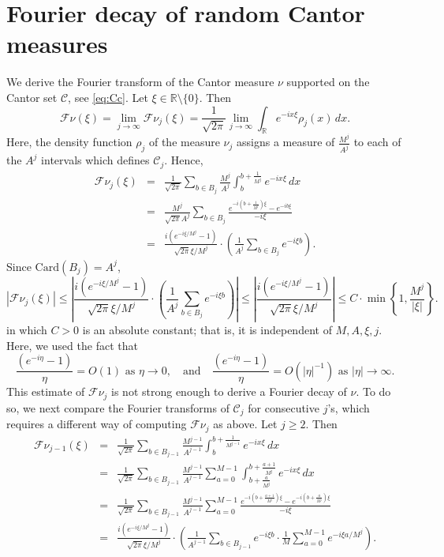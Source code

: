 \documentclass[12pt,reqno]{amsart}
\newcommand\Card{\mathrm{Card}}
\newcommand\Cc{\mathcal{C}}
\newcommand\Fc{\mathcal{F}}
\newcommand\R{\mathbb{R}}
\theoremstyle{plain}
\theoremstyle{remark}
\numberwithin{equation}{section}
\begin{document}
\section{Fourier decay of random Cantor measures}\label{sec:FD}
We derive the Fourier transform of the Cantor measure $\nu$ supported on the Cantor set $\Cc$, see \eqref{eq:Cc}. Let $\xi\in\R\setminus\{0\}$. Then 
$$\Fc\nu(\xi)=\lim_{j\to\infty}\Fc\nu_j(\xi)=\frac{1}{\sqrt{2\pi}}\lim_{j\to\infty}\int_\R e^{-ix\xi}\rho_j(x)\,dx.$$
Here, the density function $\rho_j$ of the measure $\nu_j$ assigns a measure of $\frac{M^j}{A^j}$ to each of the $A^j$ intervals which defines $\Cc_j$. Hence,
\begin{eqnarray*}
\Fc\nu_j(\xi)&=&\frac{1}{\sqrt{2\pi}}\sum_{b\in B_j}\frac{M^j}{A^j}\int_b^{b+\frac{1}{M^j}}e^{-ix\xi}\,dx\\
&=&\frac{M^j}{\sqrt{2\pi}A^j}\sum_{b\in B_j}\frac{e^{-i\left(b+\frac{1}{M^j}\right)\xi}-e^{-ib\xi}}{-i\xi}\\
&=&\frac{i\left(e^{-i\xi/M^j}-1\right)}{\sqrt{2\pi}\xi/M^j}\cdot\left(\frac{1}{A^j}\sum_{b\in B_j}e^{-i\xi b}\right).
\end{eqnarray*}
Since $\Card(B_j)=A^j$,
$$\left|\Fc\nu_j(\xi)\right|\le\left|\frac{i\left(e^{-i\xi/M^j}-1\right)}{\sqrt{2\pi}\xi/M^j}\cdot\left(\frac{1}{A^j}\sum_{b\in B_j}e^{-i\xi b}\right)\right|\le\left|\frac{i\left(e^{-i\xi/M^j}-1\right)}{\sqrt{2\pi}\xi/M^j}\right|\le C\cdot\min\left\{1,\frac{M^j}{|\xi|}\right\}.$$
in which $C>0$ is an absolute constant; that is, it is independent of $M,A,\xi,j$. Here, we used the fact that
$$\frac{\left(e^{-i\eta}-1\right)}{\eta}=O(1)\text{ as }\eta\to0,\quad\text{and}\quad\frac{\left(e^{-i\eta}-1\right)}{\eta}=O\left(|\eta|^{-1}\right)\text{ as }|\eta|\to\infty.$$
This estimate of $\Fc\nu_j$ is not strong enough to derive a Fourier decay of $\nu$. To do so, we next compare the Fourier transforms of $\Cc_j$ for consecutive $j$'s, which requires a different way of computing $\Fc\nu_j$ as above. Let $j\ge2$. Then
\begin{eqnarray*}
\Fc\nu_{j-1}(\xi)&=&\frac{1}{\sqrt{2\pi}}\sum_{b\in B_{j-1}}\frac{M^{j-1}}{A^{j-1}}\int_b^{b+\frac{1}{M^{j-1}}}e^{-ix\xi}\,dx\\
&=&\frac{1}{\sqrt{2\pi}}\sum_{b\in B_{j-1}}\frac{M^{j-1}}{A^{j-1}}\sum_{a=0}^{M-1}\int_{b+\frac{a}{M^j}}^{b+\frac{a+1}{M^j}}e^{-ix\xi}\,dx\\
&=&\frac{1}{\sqrt{2\pi}}\sum_{b\in B_{j-1}}\frac{M^{j-1}}{A^{j-1}}\sum_{a=0}^{M-1}\frac{e^{-i\left(b+\frac{a+1}{M^j}\right)\xi}-e^{-i\left(b+\frac{a}{M^j}\right)\xi}}{-i\xi}\\
&=&\frac{i\left(e^{-i\xi/M^j}-1\right)}{\sqrt{2\pi}\xi/M^j}\cdot\left(\frac{1}{A^{j-1}}\sum_{b\in B_{j-1}}e^{-i\xi b}\cdot\frac1M\sum_{a=0}^{M-1}e^{-i\xi a/M^j}\right).
\end{eqnarray*}
\end{document}
